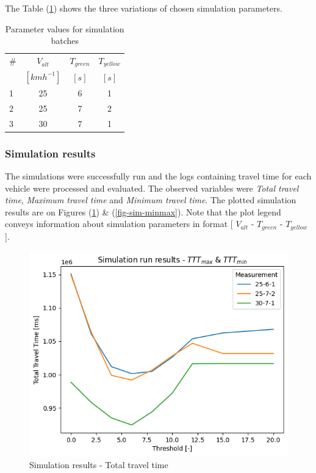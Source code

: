 \documentclass[main.tex]{subfiles}
\begin{document}
The Table (\ref{tab-sims}) shows the three variations of chosen simulation parameters.

\begin{table}[htbp]
    \caption{Parameter values for simulation batches}
    \centering\begin{tabular}{lccc}
        \toprule
        \# & $V_{alt}$ & $T_{green}$ & $T_{yellow}$ \\ 
         & $[kmh^{-1}]$ & $[s]$ & $[s]$ \\ \midrule
        1 & 25  & 6 & 1 \\
        2 & 25  & 7 & 2 \\
        3 & 30  & 7 & 1 \\ \bottomrule
    \end{tabular}
    \label{tab-sims}
\end{table}

\subsubsection{Simulation results}

The simulations were successfully run and the logs containing travel time for each vehicle were processed 
and evaluated. The observed variables were \emph{Total travel time}, \emph{Maximum travel time}
and \emph{Minimum travel time}. The plotted simulation results are on Figures (\ref{fig-sim-ttt}) \& (\ref{fig-sim-minmax}).
Note that the plot legend conveys information about simulation parameters in format [ $V_{alt}$ - $T_{green}$ - $T_{yellow}$ ].

\begin{figure}[htbp]
    \centering
    \includegraphics[width=.8\textwidth]{ttt.png}
    \caption{Simulation results - Total travel time}
    \label{fig-sim-ttt}
\end{figure}
\end{document}
